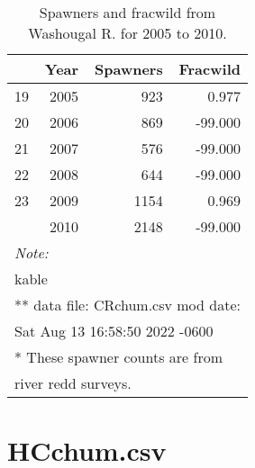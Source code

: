 \documentclass[
  letterpaper,
  oneside]{scrbook}
\begin{document}
\hypertarget{tbl-appA2}{}
\begin{table}
\caption{\label{tbl-appA2}Spawners and fracwild from Washougal R. for 2005 to 2010. }\tabularnewline

\centering
\begin{tabular}[t]{lrrr}
\toprule
  & Year & Spawners & Fracwild\\
\midrule
19 & 2005 & 923 & 0.977\\
20 & 2006 & 869 & -99.000\\
21 & 2007 & 576 & -99.000\\
22 & 2008 & 644 & -99.000\\
23 & 2009 & 1154 & 0.969\\
\addlinespace
24 & 2010 & 2148 & -99.000\\
\bottomrule
\multicolumn{4}{l}{\rule{0pt}{1em}\textit{Note: }}\\
\multicolumn{4}{l}{\rule{0pt}{1em}kable}\\
\multicolumn{4}{l}{\textsuperscript{} ** data file: CRchum.csv mod date:}\\
\multicolumn{4}{l}{Sat Aug 13 16:58:50 2022 -0600}\\
\multicolumn{4}{l}{\textsuperscript{} * These spawner counts are from}\\
\multicolumn{4}{l}{river redd surveys.}\\
\end{tabular}
\end{table}

\newpage

\hypertarget{hcchum.csv}{%
\chapter{HCchum.csv}\label{hcchum.csv}}
\end{document}
